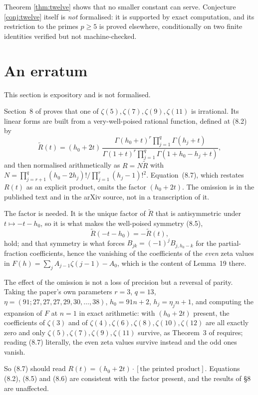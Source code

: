\documentclass[11pt,a4paper]{amsart}
\theoremstyle{plain}
\theoremstyle{definition}
\theoremstyle{remark}
\begin{document}
Theorem \ref{thm:twelve} shows that no smaller constant can serve. Conjecture
\ref{conj:twelve} itself is \emph{not} formalised: it is supported by exact computation,
and its restriction to the primes $p\ge5$ is proved elsewhere, conditionally on two
finite identities verified but not machine-checked.

\section{An erratum}\label{sec:errata}

This section is expository and is not formalised.

Section~8 of \cite{Zu04} proves that one of $\zeta(5),\zeta(7),\zeta(9),\zeta(11)$ is
irrational. Its linear forms are built from a very-well-poised rational function, defined
at (8.2) by
\[
  \widetilde R(t)=(h_0+2t)\,
  \frac{\Gamma(h_0+t)^r\prod_{j=1}^{q}\Gamma(h_j+t)}
       {\Gamma(1+t)^r\prod_{j=1}^{q}\Gamma(1+h_0-h_j+t)},
\]
and then normalised arithmetically as $R=N\widetilde R$ with
$N=\prod_{j=r+1}^{q}(h_0-2h_j)!\big/\prod_{j=1}^{r}(h_j-1)!^2$. Equation~(8.7), which
restates $R(t)$ as an explicit product, omits the factor $(h_0+2t)$. The omission is in
the published text and in the arXiv source, not in a transcription of it.

The factor is needed. It is the unique factor of $\widetilde R$ that is antisymmetric
under $t\mapsto -t-h_0$, so it is what makes the well-poised symmetry (8.5),
\[
  \widetilde R(-t-h_0)=-\widetilde R(t),
\]
hold; and that symmetry is what forces $B_{jk}=(-1)^jB_{j,h_0-k}$ for the partial-fraction
coefficients, hence the vanishing of the coefficients of the \emph{even} zeta values in
$F(h)=\sum_j A_{j-1}\zeta(j-1)-A_0$, which is the content of Lemma~19 there.

The effect of the omission is not a loss of precision but a reversal of parity. Taking the
paper's own parameters $r=3$, $q=13$, $\eta=(91;27,27,27,29,30,\dots,38)$, $h_0=91n+2$,
$h_j=\eta_jn+1$, and computing the expansion of $F$ at $n=1$ in exact arithmetic: with
$(h_0+2t)$ present, the coefficients of $\zeta(3)$ and of $\zeta(4),\zeta(6),\zeta(8),
\zeta(10),\zeta(12)$ are all exactly zero and only $\zeta(5),\zeta(7),\zeta(9),\zeta(11)$
survive, as Theorem~3 of \cite{Zu04} requires; reading (8.7) literally, the even zeta
values survive instead and the odd ones vanish.

So (8.7) should read $R(t)=(h_0+2t)\cdot[\text{the printed product}]$. Equations (8.2),
(8.5) and (8.6) are consistent with the factor present, and the results of \S8 are
unaffected.
\end{document}

